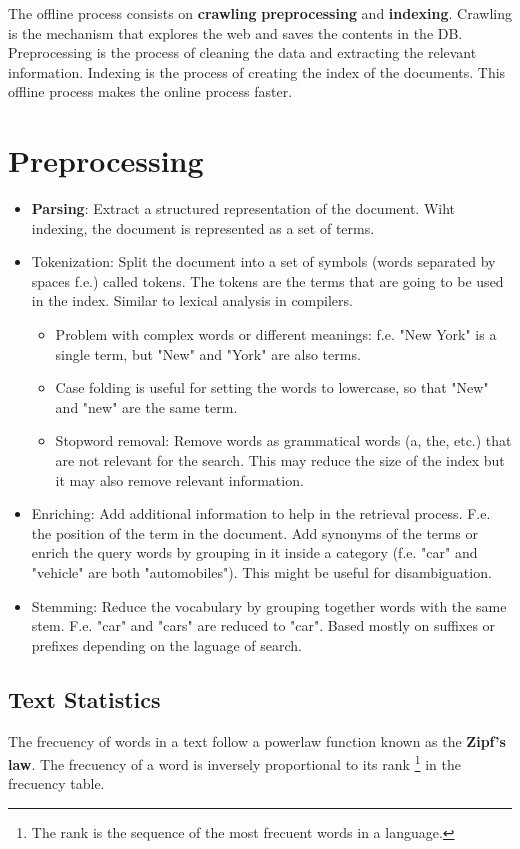 \documentclass{article}
\begin{document}
The offline process consists on \textbf{crawling} \textbf{preprocessing} and \textbf{indexing}. Crawling is the mechanism that explores the web and saves the contents in the DB. Preprocessing is the process of cleaning the data and extracting the relevant information. Indexing is the process of creating the index of the documents. This offline process makes the online process faster.

\section{Preprocessing}
\begin{itemize}
    \item \textbf{Parsing}: Extract a structured representation of the document. Wiht indexing, the document is represented as a set of terms.
    \item Tokenization: Split the document into a set of symbols (words separated by spaces f.e.) called tokens. The tokens are the terms that are going to be used in the index.  Similar to lexical analysis in compilers.
    \begin{itemize}
        \item Problem with complex words or different meanings: f.e. "New York" is a single term, but "New" and "York" are also terms.
        \item Case folding is useful for setting the words to lowercase, so that "New" and "new" are the same term.
        \item Stopword removal: Remove words as grammatical words (a, the, etc.) that are not relevant for the search. This may reduce the size of the index but it may also remove relevant information.
    \end{itemize}
    \item Enriching: Add additional information to help in the retrieval process. F.e. the position of the term in the document. Add synonyms of the terms or enrich the query words by grouping in it inside a category (f.e. "car" and "vehicle" are both "automobiles"). This might be useful for disambiguation.
    \item Stemming: Reduce the vocabulary by grouping together words with the same stem. F.e. "car" and "cars" are reduced to "car". Based mostly on suffixes or prefixes depending on the laguage of search.
\end{itemize}
    
\subsection{Text Statistics}
The frecuency of words in a text follow a powerlaw function known as the \textbf{Zipf's law}. The frecuency of a word is inversely proportional to its rank \footnote{The rank is the sequence of the most frecuent words in a language.} in the frecuency table.
\end{document}
